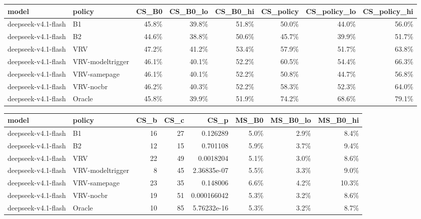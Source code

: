 \begin{tabular}{llrrrrrr}
\toprule
model & policy & CS\_B0 & CS\_B0\_lo & CS\_B0\_hi & CS\_policy & CS\_policy\_lo & CS\_policy\_hi \\
\midrule
deepseek-v4.1-flash & B1 & 45.8\% & 39.8\% & 51.8\% & 50.0\% & 44.0\% & 56.0\% \\
deepseek-v4.1-flash & B2 & 44.6\% & 38.8\% & 50.6\% & 45.7\% & 39.9\% & 51.7\% \\
deepseek-v4.1-flash & VRV & 47.2\% & 41.2\% & 53.4\% & 57.9\% & 51.7\% & 63.8\% \\
deepseek-v4.1-flash & VRV-modeltrigger & 46.1\% & 40.1\% & 52.2\% & 60.5\% & 54.4\% & 66.3\% \\
deepseek-v4.1-flash & VRV-samepage & 46.1\% & 40.1\% & 52.2\% & 50.8\% & 44.7\% & 56.8\% \\
deepseek-v4.1-flash & VRV-nocbr & 46.2\% & 40.3\% & 52.2\% & 58.3\% & 52.3\% & 64.0\% \\
deepseek-v4.1-flash & Oracle & 45.8\% & 39.9\% & 51.9\% & 74.2\% & 68.6\% & 79.1\% \\
\bottomrule
\end{tabular}

\begin{tabular}{llrrrrrr}
\toprule
model & policy & CS\_b & CS\_c & CS\_p & MS\_B0 & MS\_B0\_lo & MS\_B0\_hi \\
\midrule
deepseek-v4.1-flash & B1 & 16 & 27 & 0.126289 & 5.0\% & 2.9\% & 8.4\% \\
deepseek-v4.1-flash & B2 & 12 & 15 & 0.701108 & 5.9\% & 3.7\% & 9.4\% \\
deepseek-v4.1-flash & VRV & 22 & 49 & 0.0018204 & 5.1\% & 3.0\% & 8.6\% \\
deepseek-v4.1-flash & VRV-modeltrigger & 8 & 45 & 2.36835e-07 & 5.5\% & 3.3\% & 9.0\% \\
deepseek-v4.1-flash & VRV-samepage & 23 & 35 & 0.148006 & 6.6\% & 4.2\% & 10.3\% \\
deepseek-v4.1-flash & VRV-nocbr & 19 & 51 & 0.000166042 & 5.3\% & 3.2\% & 8.6\% \\
deepseek-v4.1-flash & Oracle & 10 & 85 & 5.76232e-16 & 5.3\% & 3.2\% & 8.7\% \\
\bottomrule
\end{tabular}

